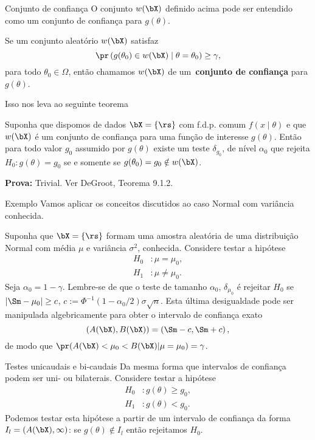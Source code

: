 \begin{frame}{Conjunto de confiança}
 O conjunto $w(\bX)$ definido acima pode ser entendido como um conjunto de confiança para $g(\theta)$.
 \begin{defn}
 \label{def:confidence_set}
  Se um conjunto aleatório $w(\bX)$ satisfaz 
  \[\pr\left(g(\theta_0) \in w(\bX) \mid \theta = \theta_0 \right)  \geq \gamma, \]
  para todo $\theta_0 \in \Omega$, então chamamos $w(\bX)$ de um~\textbf{conjunto de confiança} para $g(\theta)$.
 \end{defn}
 Isso nos leva ao seguinte teorema
 \begin{theo}
 \label{thm:testing_hypotheses_confidence_sets}
  Suponha que dispomos de dados $\bX = \{ \rs \}$ com f.d.p. comum $f(x \mid \theta)$ e que $w(\bX)$ é um conjunto de confiança para uma função de interesse $g(\theta)$. 
  Então para todo valor $g_0$  assumido por $g(\theta)$ existe um teste $\delta_{g_0}$, de nível $\alpha_0$ que rejeita $H_0: g(\theta) = g_0 $ se e somente se $g(\theta_0)  = g_0 \notin w(\bX)$.
 \end{theo}
 \textbf{Prova:} Trivial.
 Ver DeGroot, Teorema 9.1.2.
\end{frame}

\begin{frame}{Exemplo}
 Vamos aplicar os conceitos discutidos ao caso Normal com variância conhecida.
 \begin{exemplo}
 \label{ex:test_normal_mean}
  Suponha que $\bX = \{ \rs \}$ formam uma amostra aleatória de uma distribuição Normal com média $\mu$ e variância $\sigma^2$, conhecida.
  Considere testar a hipótese
  \begin{align*}
   H_0 &:  \mu = \mu_0, \\
   H_1&: \mu \neq \mu_0.
  \end{align*}
  Seja $\alpha_0 = 1-\gamma$. 
  Lembre-se de que o teste de tamanho $\alpha_0$, $\delta_{\mu_0}$ é rejeitar $H_0$ se $|\Sm-\mu_0| \geq c$, $c := \Phi^{-1}\left(1-\alpha_0/2\right)\sigma\sqrt{n}$.
  Esta última desigualdade pode ser manipulada algebricamente para obter o intervalo de confiança exato
  $$ (A(\bX), B(\bX)) = \left( \Sm - c, \Sm + c\right), $$
  de modo que $\pr(A(\bX) < \mu_0 < B(\bX) | \mu = \mu_0) = \gamma$.
 \end{exemplo}
\end{frame}

\begin{frame}{Testes unicaudais e bi-caudais}
 Da mesma forma que intervalos de confiança podem ser uni- ou bilaterais. 
 Considere testar a hipótese
  \begin{align*}
   H_0 &:  g(\theta) \geq g_0, \\
   H_1&: g(\theta) < g_0.
  \end{align*}
Podemos testar esta hipótese a partir de um intervalo de confiança da forma $I_l = (A(\bX), \infty)$: se $g(\theta) \notin I_l$ então rejeitamos $H_0$.  
\end{frame}

